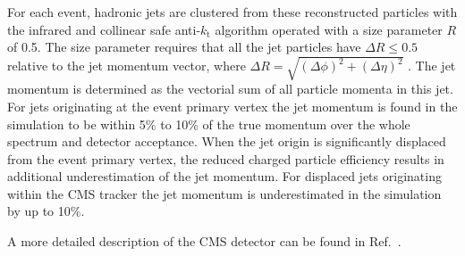 For each event, hadronic jets are clustered from these reconstructed particles with the infrared and collinear safe
 anti-$k_\mathrm{t}$ algorithm 
operated with a size parameter $R$ of 0.5. The size parameter requires that all the jet 
particles have $\Delta R \leq 0.5$ relative to the jet momentum vector, where
 $\Delta R=\sqrt{(\Delta\phi)^2 + (\Delta\eta)^2}$ \cite{Cacciari:2008gp}. 
The jet momentum is determined as the vectorial sum of all particle momenta in this jet.
For jets originating at the event primary vertex the jet momentum is found in the simulation to be within 5\% to 10\% of the true momentum over 
the whole \pt spectrum and detector acceptance. 
When the jet origin is significantly displaced from the event primary vertex, the reduced 
charged particle efficiency results in additional underestimation of the jet momentum. 
For displaced jets originating within the CMS tracker the jet momentum is underestimated in the simulation by up to 10\%.

A more detailed description of the CMS detector can be found in Ref.~\cite{Chatrchyan:2008zzk}.  
